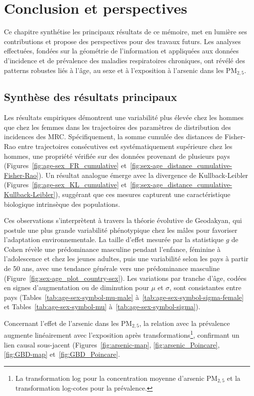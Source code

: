 \chapter{Conclusion et perspectives}
\label{chap:conclusion}

Ce chapitre synthétise les principaux résultats de ce mémoire, met en lumière ses contributions et propose des perspectives pour des travaux futurs. Les analyses effectuées, fondées sur la géométrie de l'information et appliquées aux données d'incidence et de prévalence des maladies respiratoires chroniques, ont révélé des patterns robustes liés à l'âge, au sexe et à l'exposition à l'arsenic dans les PM$_{2,5}$.

\section{Synthèse des résultats principaux}

Les résultats empiriques démontrent une variabilité plus élevée chez les hommes que chez les femmes dans les trajectoires des paramètres de distribution des incidences des MRC. Spécifiquement, la somme cumulée des distances de Fisher-Rao entre trajectoires consécutives est systématiquement supérieure chez les hommes, une propriété vérifiée sur des données provenant de plusieurs pays (Figures~\ref{fig:age-sex_FR_cumulative} et~\ref{fig:sex-age_distance_cumulative-Fisher-Rao}). Un résultat analogue émerge avec la divergence de Kullback-Leibler (Figures~\ref{fig:age-sex_KL_cumulative} et~\ref{fig:sex-age_distance_cumulative-Kullback-Leibler}), suggérant que ces mesures capturent une caractéristique biologique intrinsèque des populations.

Ces observations s'interprètent à travers la théorie évolutive de Geodakyan, qui postule une plus grande variabilité phénotypique chez les mâles pour favoriser l'adaptation environnementale. La taille d'effet mesurée par la statistique $g$ de Cohen révèle une prédominance masculine pendant l'enfance, féminine à l'adolescence et chez les jeunes adultes, puis une variabilité selon les pays à partir de 50 ans, avec une tendance générale vers une prédominance masculine (Figure~\ref{fig:sex-age_plot_country-sex}). Les variations par tranche d'âge, codées en signes d'augmentation ou de diminution pour $\mu$ et $\sigma$, sont consistantes entre pays (Tables~\ref{tab:age-sex-symbol-mu-male} à~\ref{tab:age-sex-symbol-sigma-female} et Tables~\ref{tab:age-sex-symbol-mu} à~\ref{tab:age-sex-symbol-sigma}).

Concernant l'effet de l'arsenic dans les PM$_{2,5}$, la relation avec la prévalence augmente linéairement avec l'exposition après transformations\footnote{La transformation log pour la concentration moyenne d'arsenic PM$_{2,5}$ et la transformation log-cotes pour la prévalence.}, confirmant un lien causal sous-jacent (Figures~\ref{fig:arsenic-map}, \ref{fig:arsenic_Poincare}, \ref{fig:GBD-map} et~\ref{fig:GBD_Poincare}.


